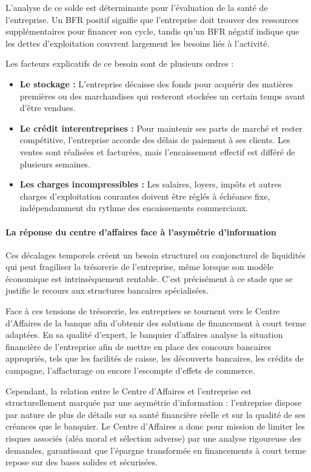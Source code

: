 \documentclass[12pt,a4paper]{report}
\begin{document}
L'analyse de ce solde est déterminante pour l'évaluation de la santé de l'entreprise. Un BFR positif signifie que l'entreprise doit trouver des ressources supplémentaires pour financer son cycle, tandis qu'un BFR négatif indique que les dettes d'exploitation couvrent largement les besoins liés à l'activité.

Les facteurs explicatifs de ce besoin sont de plusieurs ordres :

\begin{itemize}
  \item \textbf{Le stockage :} L'entreprise décaisse des fonds pour acquérir des matières premières ou des marchandises qui resteront stockées un certain temps avant d'être vendues.
  \item \textbf{Le crédit interentreprises :} Pour maintenir ses parts de marché et rester compétitive, l'entreprise accorde des délais de paiement à ses clients. Les ventes sont réalisées et facturées, mais l'encaissement effectif est différé de plusieurs semaines.
  \item \textbf{Les charges incompressibles :} Les salaires, loyers, impôts et autres charges d'exploitation courantes doivent être réglés à échéance fixe, indépendamment du rythme des encaissements commerciaux.
\end{itemize}

\paragraph{La réponse du centre d'affaires face à l'asymétrie d'information}

Ces décalages temporels créent un besoin structurel ou conjoncturel de liquidités qui peut fragiliser la trésorerie de l'entreprise, même lorsque son modèle économique est intrinsèquement rentable. C'est précisément à ce stade que se justifie le recours aux structures bancaires spécialisées.

Face à ces tensions de trésorerie, les entreprises se tournent vers le Centre d'Affaires de la banque afin d'obtenir des solutions de financement à court terme adaptées. En sa qualité d'expert, le banquier d'affaires analyse la situation financière de l'entreprise afin de mettre en place des concours bancaires appropriés, tels que les facilités de caisse, les découverts bancaires, les crédits de campagne, l'affacturage ou encore l'escompte d'effets de commerce.

Cependant, la relation entre le Centre d'Affaires et l'entreprise est structurellement marquée par une asymétrie d'information : l'entreprise dispose par nature de plus de détails sur sa santé financière réelle et sur la qualité de ses créances que le banquier. Le Centre d'Affaires a donc pour mission de limiter les risques associés (aléa moral et sélection adverse) par une analyse rigoureuse des demandes, garantissant que l'épargne transformée en financements à court terme repose sur des bases solides et sécurisées.
\end{document}
